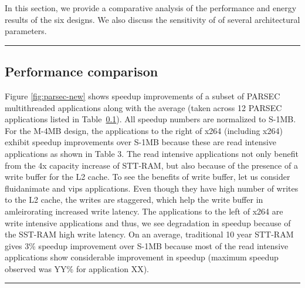In this section, we provide a comparative analysis of the performance and energy results of the six designs.
We also discuss the sensitivity of of several architectural parameters.



\begin{figure*} [t]
\centering
 \hrule
 \caption{\label{fig:parsec-new} \scriptsize \bf Normalized speedup for PARSEC Applications }
\end{figure*}



\subsection {Performance comparison}
Figure \ref{fig:parsec-new} shows speedup improvements of a subset of PARSEC 
multithreaded applications along with the average (taken across 12 PARSEC applications listed in Table~\ref{}). 
All speedup numbers are normalized to S-1MB.
For the M-4MB design, the applications to the right of x264 (including x264) exhibit
speedup improvements over S-1MB because these are read intensive applications as shown in Table 3.
The read intensive applications not only benefit from the 4x capacity increase of STT-RAM, but also 
because of the presence of a write buffer for the L2 cache.
To see the benefits of write buffer,  let us consider fluidanimate and vips applications.
Even though they have high number of writes to the L2 cache, the writes are staggered, which help the write buffer in amleirorating increased write latency.
The applications to the left of x264 are write intensive applications and thus, we see degradation in speedup
because of the SST-RAM high write latency.
On an average, traditional 10 year STT-RAM gives 3\% speedup improvement over S-1MB because most of the read
intensive applications show considerable improvement in speedup (maximum speedup observed was YY\% for application
XX).



\begin{figure*} [t]
\centering
 \hrule
 \caption{\label{fig:spec-new} \scriptsize \bf Normalized Average Instruction Throughput(IT) and Weighted Speedup(WS) for SPEC 2006 multiprogrammed mixes. }
\end{figure*}


